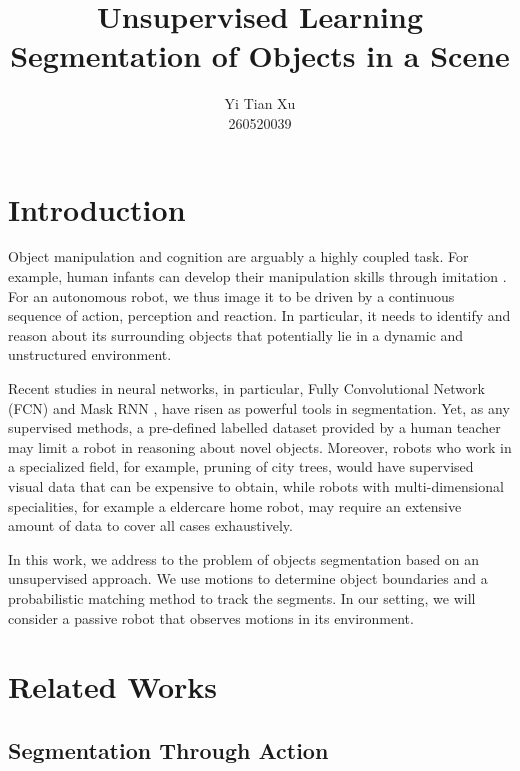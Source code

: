 \documentclass{article}
\begin{document}
\title{Unsupervised Learning Segmentation of Objects in a Scene}
\author{Yi Tian Xu\\260520039}

\maketitle

\abstract{}


\section{Introduction}
Object manipulation and cognition are arguably a highly coupled task. For example, human infants can develop their manipulation skills through imitation \cite{cogn1}. For an autonomous robot, we thus image it to be driven by a continuous sequence of action, perception and reaction. In particular, it needs to identify and reason about its surrounding objects that potentially lie in a dynamic and unstructured environment. 

Recent studies in neural networks, in particular, Fully Convolutional Network (FCN) \cite{fcn} and Mask RNN \cite{rnn}, have risen as powerful tools in segmentation. Yet, as any supervised methods, a pre-defined labelled dataset provided by a human teacher may limit a robot in reasoning about novel objects. Moreover, robots who work in a specialized field, for example, pruning of city trees, would have supervised visual data that can be expensive to obtain, while robots with multi-dimensional specialities, for example a eldercare home robot, may require an extensive amount of data to cover all cases exhaustively.

In this work, we address to the problem of objects segmentation based on an unsupervised approach. We use motions to determine object boundaries and a probabilistic matching method to track the segments. In our setting, we will consider a passive robot that observes motions in its environment.

\section{Related Works}

\subsection{Segmentation Through Action}
\end{document}
